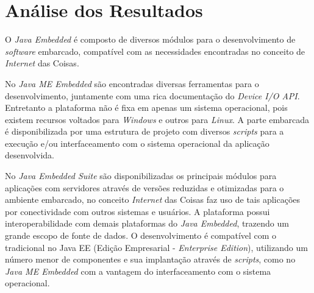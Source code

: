 %

\chapter{Análise dos Resultados}

O \textit{Java Embedded} é composto de diversos módulos para o desenvolvimento de \textit{software} embarcado, compatível com as necessidades encontradas no conceito de\textit{ Internet} das Coisas.

No \textit{Java ME Embedded} são encontradas diversas ferramentas para o desenvolvimento, juntamente com uma rica documentação do \textit{Device I/O API}. Entretanto a plataforma não é fixa em apenas um sistema operacional, pois existem recursos voltados para \textit{Windows} e outros para \textit{Linux}. A parte embarcada é disponibilizada por uma estrutura de projeto com diversos \textit{scripts} para a execução e/ou interfaceamento com o sistema operacional da aplicação desenvolvida.

No \textit{Java Embedded Suite} são disponibilizadas os principais módulos para aplicações com servidores através de versões reduzidas e otimizadas para o ambiente embarcado, no conceito \textit{Internet} das Coisas faz uso de tais aplicações por conectividade com outros sistemas e usuários. A plataforma possui interoperabilidade com demais plataformas do \textit{Java Embedded}, trazendo um grande escopo de fonte de dados. O desenvolvimento é compatível com o tradicional no Java EE (Edição Empresarial - \textit{Enterprise Edition}), utilizando um número menor de componentes e sua implantação através de \textit{scripts}, como no \textit{Java ME Embedded} com a vantagem do interfaceamento com o sistema operacional.